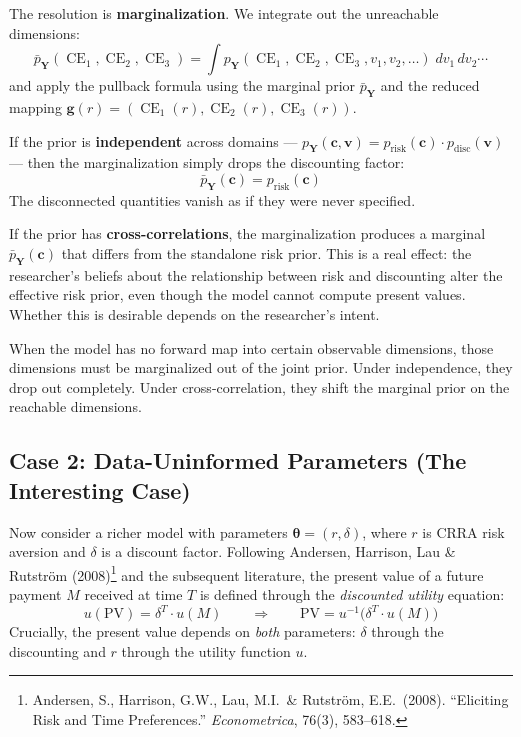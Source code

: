 \documentclass[11pt,a4paper]{article}
\theoremstyle{definition}
\newcommand{\btheta}{\boldsymbol{\theta}}
\DeclareMathOperator{\CE}{CE}
\begin{document}
The resolution is \textbf{marginalization}. We integrate out the unreachable
dimensions:
\begin{equation}
    \bar{p}_{\mathbf{Y}}(\CE_1, \CE_2, \CE_3)
    = \int p_{\mathbf{Y}}(\CE_1, \CE_2, \CE_3, v_1, v_2, \ldots)\;
    dv_1\, dv_2 \cdots
\end{equation}
and apply the pullback formula using the marginal prior
$\bar{p}_{\mathbf{Y}}$ and the reduced mapping
$\mathbf{g}(r) = (\CE_1(r), \CE_2(r), \CE_3(r))$.

If the prior is \textbf{independent} across domains ---
$p_{\mathbf{Y}}(\mathbf{c}, \mathbf{v}) = p_{\text{risk}}(\mathbf{c}) \cdot
p_{\text{disc}}(\mathbf{v})$ --- then the marginalization simply drops the
discounting factor:
\begin{equation}
    \bar{p}_{\mathbf{Y}}(\mathbf{c}) = p_{\text{risk}}(\mathbf{c})
\end{equation}
The disconnected quantities vanish as if they were never specified.

If the prior has \textbf{cross-correlations}, the marginalization produces a
marginal $\bar{p}_{\mathbf{Y}}(\mathbf{c})$ that differs from the standalone
risk prior. This is a real effect: the researcher's beliefs about the
relationship between risk and discounting alter the effective risk prior,
even though the model cannot compute present values. Whether this is desirable
depends on the researcher's intent.

\begin{keyresult}
When the model has no forward map into certain observable dimensions, those
dimensions must be marginalized out of the joint prior. Under independence,
they drop out completely. Under cross-correlation, they shift the marginal
prior on the reachable dimensions.
\end{keyresult}

\subsection{Case 2: Data-Uninformed Parameters (The Interesting Case)}
\label{sec:data_uninformed}

Now consider a richer model with parameters
$\btheta = (r, \delta)$, where $r$ is CRRA risk aversion and $\delta$ is a
discount factor. Following Andersen, Harrison, Lau \& Rutstr\"{o}m
(2008)\footnote{Andersen, S., Harrison, G.W., Lau, M.I.\ \&
Rutstr\"{o}m, E.E.\ (2008). ``Eliciting Risk and Time Preferences.''
\textit{Econometrica}, 76(3), 583--618.}
and the subsequent literature, the present value of a future payment $M$
received at time $T$ is defined through the \emph{discounted utility}
equation:
\begin{equation}
    u(\mathrm{PV}) = \delta^T \cdot u(M)
    \qquad \Longrightarrow \qquad
    \mathrm{PV} = u^{-1}\!\big(\delta^T \cdot u(M)\big)
\end{equation}
Crucially, the present value depends on \emph{both} parameters: $\delta$
through the discounting and $r$ through the utility function $u$.
\end{document}
